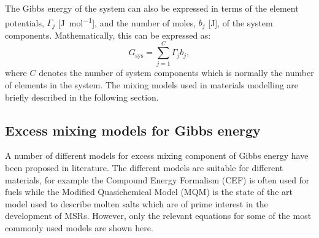 	The Gibbs energy of  the system can also be expressed in terms of the element potentials, $\Gamma_j$ [\si{\joule \per \mole}], and the number of moles, $b_j$ [\si{\joule}], of the system components. Mathematically, this can be expressed as:
	\begin{equation}\label{eq:elempot}
        		G_\text{sys} = \sum_{j=1}^{C} \Gamma_j b_j,
    	\end{equation}
	where $C$ denotes the number of system components which is normally the number of elements in the system. The mixing models used in materials modelling are briefly described in the following section.

	\subsection{Excess mixing models for Gibbs energy}
	A number of different models for excess mixing component of Gibbs energy have been proposed in literature. The different models are suitable for different materials, for example the Compound Energy Formalism (CEF) is often used for  fuels while the Modified Quasichemical Model (MQM) is the state of the art model used to describe molten salts which are of prime interest in the development of MSRs. However, only the relevant equations for some of the most commonly used models are shown here.
